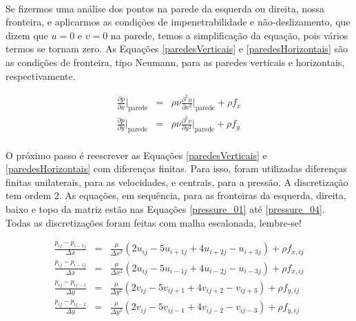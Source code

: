 \documentclass[poisson.tex]{subfiles}
\begin{document}
\paragraph{} Se fizermos uma análise dos pontos na parede da esquerda ou
direita, nossa fronteira, e aplicarmos as condições de impenetrabilidade e não-deslizamento, que
dizem que $u=0$ e $v=0$ na parede, temos a simplificação da equação, pois vários
termos se tornam zero. As Equações \ref{paredesVerticais} e \ref{paredesHorizontais} são as condições de fronteira, tipo Neumann, para as paredes verticais e horizontais, respectivamente.

\begin{eqnarray}
\frac{\partial p}{\partial x}\Bigg|_{\textrm{parede}}&=&\rho\nu\frac{\partial^2
u}{\partial x^2}\Bigg|_{\textrm{parede}}+\rho f_x\label{paredesVerticais}\\
\frac{\partial p}{\partial y}\Bigg|_{\textrm{parede}}&=&\rho\nu\frac{\partial^2
v}{\partial y^2}\Bigg|_{\textrm{parede}}+\rho f_y\label{paredesHorizontais}
\end{eqnarray}

\paragraph{} O próximo passo é reescrever as Equações \ref{paredesVerticais}  e \ref{paredesHorizontais} com diferenças finitas. Para isso, foram utilizadas diferenças finitas unilaterais, para as velocidades, e centrais, para a pressão. A discretização tem ordem 2. As equações, em
sequência, para as fronteiras da esquerda, direita, baixo e topo da matriz estão nas Equações \ref{pressure_01} até \ref{pressure_04}. Todas as discretizações foram feitas com malha escalonada, lembre-se!

\begin{eqnarray}
\frac{p_{ij}-p_{i-1j}}{\Delta x}&=&\frac{\mu}{\Delta x^2}(2u_{ij}-5u_{i+1j}+4u_{i+2j}-u_{i+3j})+\rho f_{x,ij} \label{pressure_01}\\
\frac{p_{ij}-p_{i-1j}}{\Delta x}&=&\frac{\mu}{\Delta x^2}(2u_{ij}-5u_{i-1j}+4u_{i-2j}-u_{i-3j})+\rho f_{x,ij}\label{pressure_02}\\
\frac{p_{ij}-p_{ij-1}}{\Delta y}&=&\frac{\mu}{\Delta y^2}(2v_{ij}-5v_{ij+1}+4v_{ij+2}-v_{ij+3})+\rho f_{y,ij} \label{pressure_03}\\
\frac{p_{ij}-p_{ij-1}}{\Delta y}&=&\frac{\mu}{\Delta y^2}(2v_{ij}-5v_{ij-1}+4v_{ij-2}-v_{ij-3})+\rho f_{y,ij} \label{pressure_04}
\end{eqnarray}
\end{document}
